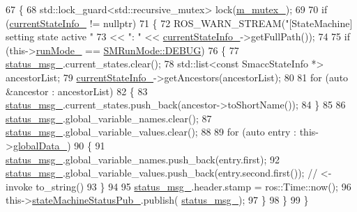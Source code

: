 \begin{DoxyCode}
67 \{
68     std::lock\_guard<std::recursive\_mutex> lock(\hyperlink{classsmacc_1_1ISmaccStateMachine_aac785541646e5c517273bf31072505a1}{m\_mutex\_});
69 
70     \textcolor{keywordflow}{if} (\hyperlink{classsmacc_1_1ISmaccStateMachine_a95e42f735cecdc231ad5372bf9fe7eaf}{currentStateInfo\_} != \textcolor{keyword}{nullptr})
71     \{
72         ROS\_WARN\_STREAM(\textcolor{stringliteral}{"[StateMachine] setting state active "}
73                         << \textcolor{stringliteral}{": "} << \hyperlink{classsmacc_1_1ISmaccStateMachine_a95e42f735cecdc231ad5372bf9fe7eaf}{currentStateInfo\_}->getFullPath());
74 
75         \textcolor{keywordflow}{if} (this->\hyperlink{classsmacc_1_1ISmaccStateMachine_a9f8cfbf577f7ae7a48b7a328e2e6b589}{runMode\_} == \hyperlink{namespacesmacc_a3e4f79486ea6ea6342dd3c712d16a4f6adc30ec20708ef7b0f641ef78b7880a15}{SMRunMode::DEBUG})
76         \{
77             \hyperlink{classsmacc_1_1ISmaccStateMachine_a4f47dd614f12a95e7a3c46d465ce4b13}{status\_msg\_}.current\_states.clear();
78             std::list<const SmaccStateInfo *> ancestorList;
79             \hyperlink{classsmacc_1_1ISmaccStateMachine_a95e42f735cecdc231ad5372bf9fe7eaf}{currentStateInfo\_}->getAncestors(ancestorList);
80 
81             \textcolor{keywordflow}{for} (\textcolor{keyword}{auto} &ancestor : ancestorList)
82             \{
83                 \hyperlink{classsmacc_1_1ISmaccStateMachine_a4f47dd614f12a95e7a3c46d465ce4b13}{status\_msg\_}.current\_states.push\_back(ancestor->toShortName());
84             \}
85 
86             \hyperlink{classsmacc_1_1ISmaccStateMachine_a4f47dd614f12a95e7a3c46d465ce4b13}{status\_msg\_}.global\_variable\_names.clear();
87             \hyperlink{classsmacc_1_1ISmaccStateMachine_a4f47dd614f12a95e7a3c46d465ce4b13}{status\_msg\_}.global\_variable\_values.clear();
88 
89             \textcolor{keywordflow}{for} (\textcolor{keyword}{auto} entry : this->\hyperlink{classsmacc_1_1ISmaccStateMachine_ad2f9dae184ea942db632ac4532a10a91}{globalData\_})
90             \{
91                 \hyperlink{classsmacc_1_1ISmaccStateMachine_a4f47dd614f12a95e7a3c46d465ce4b13}{status\_msg\_}.global\_variable\_names.push\_back(entry.first);
92                 \hyperlink{classsmacc_1_1ISmaccStateMachine_a4f47dd614f12a95e7a3c46d465ce4b13}{status\_msg\_}.global\_variable\_values.push\_back(entry.second.first()); \textcolor{comment}{// <- invoke
       to\_string()}
93             \}
94 
95             \hyperlink{classsmacc_1_1ISmaccStateMachine_a4f47dd614f12a95e7a3c46d465ce4b13}{status\_msg\_}.header.stamp = ros::Time::now();
96             this->\hyperlink{classsmacc_1_1ISmaccStateMachine_a55a7c7b26ad4dfea441c62c6326a5414}{stateMachineStatusPub\_}.publish(
      \hyperlink{classsmacc_1_1ISmaccStateMachine_a4f47dd614f12a95e7a3c46d465ce4b13}{status\_msg\_});
97         \}
98     \}
99 \}
\end{DoxyCode}


